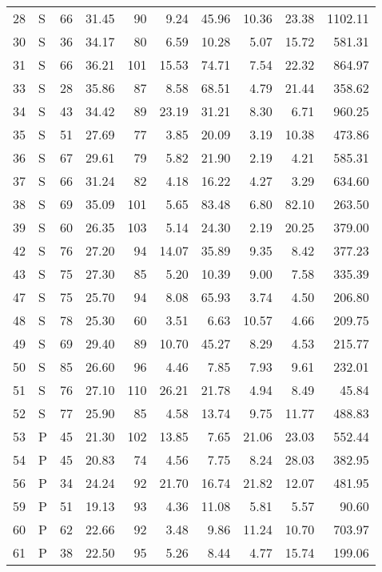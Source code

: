 \begin{table}[ht]
\begin{tabular}{rlrrrrrrrr}
  28 & S &  66 & 31.45 &  90 & 9.24 & 45.96 & 10.36 & 23.38 & 1102.11 \\ 
  30 & S &  36 & 34.17 &  80 & 6.59 & 10.28 & 5.07 & 15.72 & 581.31 \\ 
  31 & S &  66 & 36.21 & 101 & 15.53 & 74.71 & 7.54 & 22.32 & 864.97 \\ 
  33 & S &  28 & 35.86 &  87 & 8.58 & 68.51 & 4.79 & 21.44 & 358.62 \\ 
  34 & S &  43 & 34.42 &  89 & 23.19 & 31.21 & 8.30 & 6.71 & 960.25 \\ 
  35 & S &  51 & 27.69 &  77 & 3.85 & 20.09 & 3.19 & 10.38 & 473.86 \\ 
  36 & S &  67 & 29.61 &  79 & 5.82 & 21.90 & 2.19 & 4.21 & 585.31 \\ 
  37 & S &  66 & 31.24 &  82 & 4.18 & 16.22 & 4.27 & 3.29 & 634.60 \\ 
  38 & S &  69 & 35.09 & 101 & 5.65 & 83.48 & 6.80 & 82.10 & 263.50 \\ 
  39 & S &  60 & 26.35 & 103 & 5.14 & 24.30 & 2.19 & 20.25 & 379.00 \\ 
  42 & S &  76 & 27.20 &  94 & 14.07 & 35.89 & 9.35 & 8.42 & 377.23 \\ 
  43 & S &  75 & 27.30 &  85 & 5.20 & 10.39 & 9.00 & 7.58 & 335.39 \\ 
  47 & S &  75 & 25.70 &  94 & 8.08 & 65.93 & 3.74 & 4.50 & 206.80 \\ 
  48 & S &  78 & 25.30 &  60 & 3.51 & 6.63 & 10.57 & 4.66 & 209.75 \\ 
  49 & S &  69 & 29.40 &  89 & 10.70 & 45.27 & 8.29 & 4.53 & 215.77 \\ 
  50 & S &  85 & 26.60 &  96 & 4.46 & 7.85 & 7.93 & 9.61 & 232.01 \\ 
  51 & S &  76 & 27.10 & 110 & 26.21 & 21.78 & 4.94 & 8.49 & 45.84 \\ 
  52 & S &  77 & 25.90 &  85 & 4.58 & 13.74 & 9.75 & 11.77 & 488.83 \\ 
  53 & P &  45 & 21.30 & 102 & 13.85 & 7.65 & 21.06 & 23.03 & 552.44 \\ 
  54 & P &  45 & 20.83 &  74 & 4.56 & 7.75 & 8.24 & 28.03 & 382.95 \\ 
  56 & P &  34 & 24.24 &  92 & 21.70 & 16.74 & 21.82 & 12.07 & 481.95 \\ 
  59 & P &  51 & 19.13 &  93 & 4.36 & 11.08 & 5.81 & 5.57 & 90.60 \\ 
  60 & P &  62 & 22.66 &  92 & 3.48 & 9.86 & 11.24 & 10.70 & 703.97 \\ 
  61 & P &  38 & 22.50 &  95 & 5.26 & 8.44 & 4.77 & 15.74 & 199.06 \\ 

\end{tabular}
\end{table}
